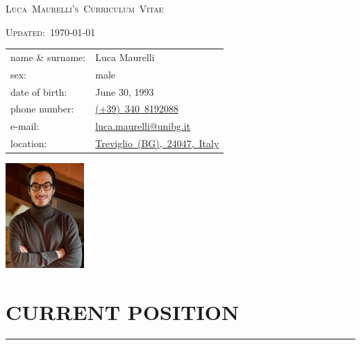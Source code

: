 \documentclass[10pt]{article}
\newcommand{\cvsection}[1]{\section*{\centering\normalsize\uppercase{#1}}\vspace{-16pt}\rule{\linewidth}{0.2pt}\vspace{6pt}}
\begin{document}
\centering
{\huge\textsc{Luca~Maurelli's~Curriculum~Vitae}\par}
{\textsc{Updated:~}\today\par}
\raggedright
\vspace{1cm}

\noindent
\begin{minipage}[t]{.5\textwidth}
	\raggedright
	\begin{tabular}{@{}ll@{}}
	name \& surname: & Luca Maurelli\\
	sex: & male\\
	date of birth: & June 30, 1993 \\
	phone number: & \href{tel:+393408192088}{(+39)~340~8192088} \\
	e-mail: & \href{mailto:luca.maurelli@unibg.it}{luca.maurelli@unibg.it} \\
	location: & \href{https://goo.gl/maps/qSb6hkSyAdgnEt5w7}{Treviglio~(BG),~24047,~Italy}
	\end{tabular}
\end{minipage}%
\begin{minipage}[t]{.5\textwidth}
	\raggedleft
	\includegraphics[height=4cm]{face.jpg}
\end{minipage}

\cvsection{current position}
\end{document}
